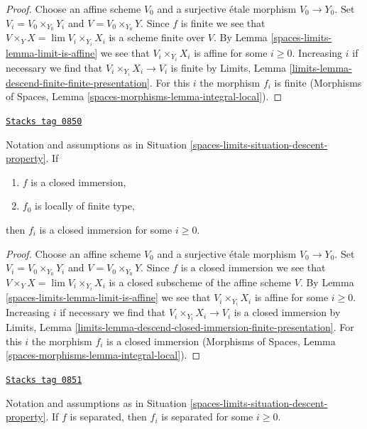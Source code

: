 \begin{proof}
Choose an affine scheme $V_0$ and a surjective \'etale morphism $V_0 \to Y_0$.
Set $V_i = V_0 \times_{Y_0} Y_i$ and $V = V_0 \times_{Y_0} Y$.
Since $f$ is finite we see that $V \times_Y X = \lim V_i \times_{Y_i} X_i$
is a scheme finite over $V$. By Lemma \ref{spaces-limits-lemma-limit-is-affine} we see that
$V_i \times_{Y_i} X_i$ is affine for some $i \geq 0$. Increasing $i$ if
necessary we find that $V_i \times_{Y_i} X_i \to V_i$ is finite by
Limits, Lemma \ref{limits-lemma-descend-finite-finite-presentation}.
For this $i$ the morphism $f_i$ is finite
(Morphisms of Spaces, Lemma \ref{spaces-morphisms-lemma-integral-local}).
\end{proof}

\begin{lemma}
\label{spaces-limits-lemma-descend-closed-immersion}
\href{https://stacks.math.columbia.edu/tag/0850}{\texttt{Stacks tag 0850}}

Notation and assumptions as in Situation \ref{spaces-limits-situation-descent-property}. If
\begin{enumerate}
\item $f$ is a closed immersion,
\item $f_0$ is locally of finite type,
\end{enumerate}
then $f_i$ is a closed immersion for some $i \geq 0$.
\end{lemma}

\begin{proof}
Choose an affine scheme $V_0$ and a surjective \'etale morphism $V_0 \to Y_0$.
Set $V_i = V_0 \times_{Y_0} Y_i$ and $V = V_0 \times_{Y_0} Y$.
Since $f$ is a closed immersion we see that
$V \times_Y X = \lim V_i \times_{Y_i} X_i$
is a closed subscheme of the affine scheme $V$. By
Lemma \ref{spaces-limits-lemma-limit-is-affine} we see that
$V_i \times_{Y_i} X_i$ is affine for some $i \geq 0$. Increasing $i$ if
necessary we find that $V_i \times_{Y_i} X_i \to V_i$ is a closed immersion by
Limits, Lemma \ref{limits-lemma-descend-closed-immersion-finite-presentation}.
For this $i$ the morphism $f_i$ is a closed immersion
(Morphisms of Spaces, Lemma \ref{spaces-morphisms-lemma-integral-local}).
\end{proof}

\begin{lemma}
\label{spaces-limits-lemma-descend-separated-morphism}
\href{https://stacks.math.columbia.edu/tag/0851}{\texttt{Stacks tag 0851}}

Notation and assumptions as in Situation \ref{spaces-limits-situation-descent-property}.
If $f$ is separated, then $f_i$ is separated for some $i \geq 0$.
\end{lemma}

